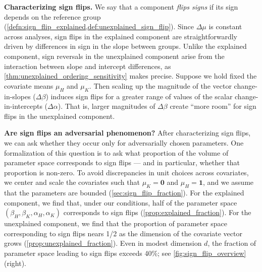 \textbf{Characterizing sign flips.}
We say that a component \emph{flips signs} if its sign depends on the reference group (\cref{defn:sign_flip_explained,def:unexplained_sign_flip}).
Since $\Delta\mu$ is constant across analyses, sign flips in the explained component are straightforwardly driven
by differences in sign in the slope between groups.
Unlike the explained component, sign reversals in the unexplained component arise from the interaction between slope and intercept differences, as \cref{thm:unexplained_ordering_sensitivity} makes precise.
Suppose we hold fixed the covariate means $\mu_H$ and $\mu_K$. Then scaling up the magnitude of the vector change-in-slopes ($\Delta \beta$) induces sign flips for a greater range of values
of the scalar change-in-intercepts ($\Delta \alpha$).
That is, larger magnitudes of \( \Delta \beta \) create ``more room'' for sign flips in the unexplained component.

\textbf{Are sign flips an adversarial phenomenon?}
After characterizing sign flips, we can ask whether they occur only for adversarially chosen parameters.
One formalization of this question is to ask what proportion of the volume of parameter space corresponds to sign flips --- and in particular, whether that proportion is non-zero.
To avoid discrepancies in unit choices across covariates, we center and scale the covariates such that $\mu_K = \mathbf{0}$ and $\mu_H = \mathbf{1}$, and we assume that the parameters are bounded (\cref{sec:sign_flip_fraction}).
For the explained component, we find that, under our conditions, half of the parameter space $(\beta_H, \beta_K, \alpha_H, \alpha_K)$ corresponds to sign flips (\cref{prop:explained_fraction}).
For the unexplained component, we find that the proportion of parameter space corresponding to sign flips nears 1/2 as the dimension of the covariate vector grows (\cref{prop:unexplained_fraction}).
Even in modest dimension $d$, the fraction of parameter space leading to sign flips exceeds 40\%; see \cref{fig:sign_flip_overview} (right).


